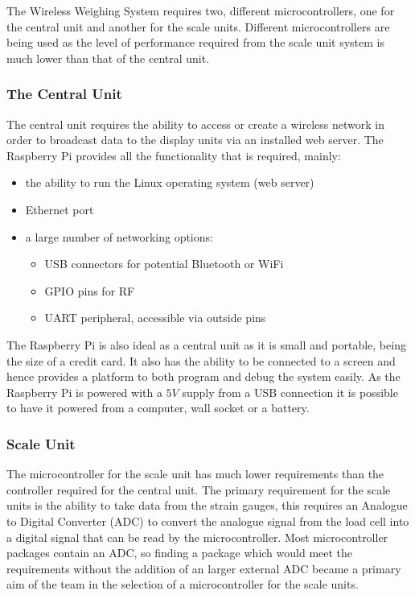 The Wireless Weighing System requires two, different microcontrollers, one for the central unit and another for the scale units. Different microcontrollers are being used as the level of performance required from the scale unit system is much lower than that of the central unit.

\subsubsection{The Central Unit}
The central unit requires the ability to access or create a wireless network in order to broadcast data to the display units via an installed web server. The Raspberry Pi \cite{raspberrypi} provides all the functionality that is required, mainly:
	\begin{itemize}
		\item the ability to run the Linux operating system (web server)
		\item Ethernet port
		\item a large number of networking options:
			\begin{itemize} 
				\item USB connectors for potential Bluetooth or WiFi
				\item GPIO pins for RF
				\item UART peripheral, accessible via outside pins
			\end{itemize}
	\end{itemize}
The Raspberry Pi is also ideal as a central unit as it is small and portable, being the size of a credit card. It also has the ability to be connected to a screen and hence provides a platform to both program and debug the system easily. As the Raspberry Pi is powered with a $5\unit{V}$ supply from a USB connection it is possible to have it powered from a computer, wall socket or a battery.

\subsubsection{Scale Unit}
The microcontroller for the scale unit has much lower requirements than the controller required for the central unit. The primary requirement for the scale units is the ability to take data from the strain gauges, this requires an Analogue to Digital Converter (ADC) to convert the analogue signal from the load cell into a digital signal that can be read by the microcontroller. Most microcontroller packages contain an ADC, so finding a package which would meet the requirements without the addition of an larger external ADC became a primary aim of the team in the selection of a microcontroller for the scale units. 

